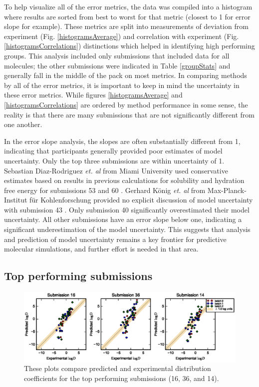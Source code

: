 To help visualize all of the error metrics, the data was compiled into a histogram where results are sorted from best to worst for that metric (closest to 1 for error slope for example). 
These metrics are split into measurements of deviation from experiment (Fig. \ref{histogramsAverage}) and correlation with experiment (Fig. \ref{histogramsCorrelations}) distinctions which helped in identifying high performing groups. 
This analysis included only submissions that included data for all molecules; the other submissions were indicated in Table \ref{groupStats} 
and generally fall in the middle of the pack on most metrics.
In comparing methods by all of the error metrics, it is important to keep in mind the uncertainty in these error metrics. 
While figures \ref{histogramsAverage} and \ref{histogramsCorrelations} are ordered by method performance in some sense, the reality is that there are many submissions that are not significantly different from one another. 

In the error slope analysis, the slopes are often substantially different from 1, indicating that participants generally provided poor estimates of model uncertainty. 
Only the top three submissions are within uncertainty of 1.
Sebastian Diaz-Rodriguez \emph{et. al} from Miami University used conservative estimates based on results in previous calculations for solubility and hydration free energy for submissions 53 and 60  \cite{Paluch:sampl5}.
Gerhard K\"{o}nig \emph{et. al} from Max-Planck-Institut f\"{u}r Kohlenforschung provided no explicit discussion of model uncertainty with submission 43  \cite{Konig:sampl5}.
Only submission 40 significantly overestimated their model uncertainty.
All other submissions have an error slope below one, indicating a significant underestimation of the model uncertainty. 
This suggests that analysis and prediction of model uncertainty remains a key frontier for predictive molecular simulations, and further effort is needed in that area.

\subsection{Top performing submissions} 
\label{results:2}
\begin{figure} 
\includegraphics{BestGroups.eps}
\caption{These plots compare predicted and experimental distribution coefficients for the top performing submissions (16, 36, and 14).}
\label{BestGroups}      
\end{figure}


